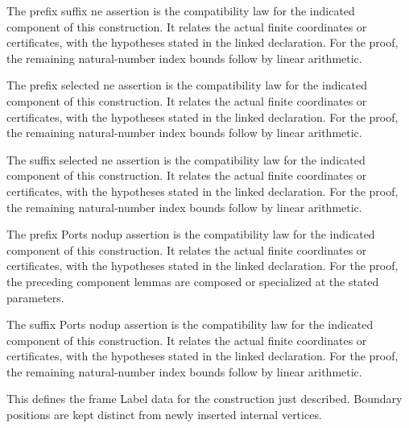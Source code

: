 The prefix suffix ne assertion is the compatibility law for the indicated component of this construction. It relates the actual finite coordinates or certificates, with the hypotheses stated in the linked declaration.
For the proof, the remaining natural-number index bounds follow by linear arithmetic.
\par{}

The prefix selected ne assertion is the compatibility law for the indicated component of this construction. It relates the actual finite coordinates or certificates, with the hypotheses stated in the linked declaration.
For the proof, the remaining natural-number index bounds follow by linear arithmetic.
\par{}

The suffix selected ne assertion is the compatibility law for the indicated component of this construction. It relates the actual finite coordinates or certificates, with the hypotheses stated in the linked declaration.
For the proof, the remaining natural-number index bounds follow by linear arithmetic.
\par{}

The prefix Ports nodup assertion is the compatibility law for the indicated component of this construction. It relates the actual finite coordinates or certificates, with the hypotheses stated in the linked declaration.
For the proof, the preceding component lemmas are composed or specialized at the stated parameters.
\par{}

The suffix Ports nodup assertion is the compatibility law for the indicated component of this construction. It relates the actual finite coordinates or certificates, with the hypotheses stated in the linked declaration.
For the proof, the remaining natural-number index bounds follow by linear arithmetic.
\par{}

This defines the frame Label data for the construction just described. Boundary positions are kept distinct from newly inserted internal vertices.
\par{}

